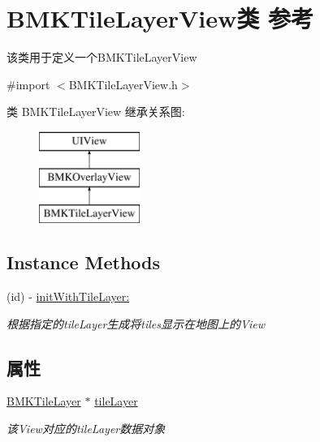 \hypertarget{interface_b_m_k_tile_layer_view}{}\section{B\+M\+K\+Tile\+Layer\+View类 参考}
\label{interface_b_m_k_tile_layer_view}


该类用于定义一个\+B\+M\+K\+Tile\+Layer\+View  




{\ttfamily \#import $<$B\+M\+K\+Tile\+Layer\+View.\+h$>$}

类 B\+M\+K\+Tile\+Layer\+View 继承关系图\+:\begin{figure}[H]
\begin{center}
\leavevmode
\includegraphics[height=3.000000cm]{interface_b_m_k_tile_layer_view}
\end{center}
\end{figure}
\subsection*{Instance Methods}
\begin{DoxyCompactItemize}
\item 
(id) -\/ \hyperlink{interface_b_m_k_tile_layer_view_a178f032ba872f71b1b1341f2319cc8ee}{init\+With\+Tile\+Layer\+:}
\begin{DoxyCompactList}\small\item\em 根据指定的tile\+Layer生成将tiles显示在地图上的\+View \end{DoxyCompactList}\end{DoxyCompactItemize}
\subsection*{属性}
\begin{DoxyCompactItemize}
\item 
\hypertarget{interface_b_m_k_tile_layer_view_a5d216203f0164327a6fc4a1fa40d9cb1}{}\hyperlink{interface_b_m_k_tile_layer}{B\+M\+K\+Tile\+Layer} $\ast$ \hyperlink{interface_b_m_k_tile_layer_view_a5d216203f0164327a6fc4a1fa40d9cb1}{tile\+Layer}\label{interface_b_m_k_tile_layer_view_a5d216203f0164327a6fc4a1fa40d9cb1}

\begin{DoxyCompactList}\small\item\em 该\+View对应的tile\+Layer数据对象 \end{DoxyCompactList}\end{DoxyCompactItemize}
